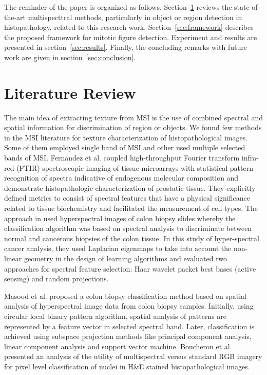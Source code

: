\documentclass[10pt,twocolumn,letterpaper]{article}
\begin{document}
The reminder of the paper is organized as follows. Section~\ref{sec:previous} reviews the state-of-the-art multispecttral methods, particularly in object or region detection in histopathology, related to this research work. Section~\ref{sec:framework} describes the proposed framework for mitotic figure detection. Experiment and results are presented in section~\ref{sec:results}. Finally, the concluding remarks with future work are given in section~\ref{sec:conclusion}.

\section{Literature Review}
\label{sec:previous}

The main idea of extracting texture from MSI is the use of combined spectral and spatial information for discrimination of region or objects. We found few methods in the MSI literature for texture characterization of histopathological images. Some of them employed single band of MSI and other used multiple selected bands of MSI. Fernandez et al. \cite{fernandez2005} coupled high-throughput Fourier transform infra-red (FTIR) spectroscopic imaging of tissue microarrays with statistical pattern recognition of spectra indicative of endogenous molecular composition and demonstrate histopathologic characterization of prostatic tissue. They explicitly defined metrics to consist of spectral features that have a physical significance related to tissue biochemistry and facilitated the measurement of cell types. The approach in \cite{woolfe2006} used hyperspectral images of colon biopsy slides whereby the classification algorithm was based on spectral analysis to discriminate between normal and cancerous biopsies of the colon tissue. In this study of hyper-spectral cancer analysis, they used Laplacian eigenmaps to take into account the non-linear geometry in the design of learning algorithms and evaluated two approaches for spectral feature selection: Haar wavelet packet best bases (active sensing) and random projections.

Masood et al. \cite{masood2009} proposed a colon biopsy classification method based on spatial analysis of hyperspectral image data from colon biopsy samples. Initially, using circular local binary pattern algorithm, spatial analysis of patterns are represented by a feature vector in selected spectral band. Later, classification is achieved using subspace projection methods like principal component analysis, linear component analysis and support vector machine. Boucheron et al. \cite{boucheron2007} presented an analysis of the utility of multispectral versus standard RGB imagery for pixel level classification of nuclei in H\&E stained histopathological images. 
\end{document}
